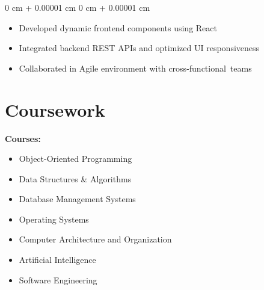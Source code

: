 \documentclass[10pt, letterpaper]{article}
\newenvironment{highlights}{
    \begin{itemize}[
        topsep=0.10 cm,
        parsep=0.10 cm,
        partopsep=0pt,
        itemsep=0pt,
        leftmargin=0 cm + 10pt
    ]
}{
    \end{itemize}
} %
\newenvironment{onecolentry}{
    \begin{adjustwidth}{
        0 cm + 0.00001 cm
    }{
        0 cm + 0.00001 cm
    }
}{
    \end{adjustwidth}
} %
\begin{document}
        \vspace{0.10 cm}
        \begin{onecolentry}
            \begin{highlights}
                \item Developed dynamic frontend components using React


                \item Integrated backend REST APIs and optimized UI responsiveness

                 \item Collaborated in Agile environment with cross-functional teams
               
               
            \end{highlights}
        \end{onecolentry}
        \vspace{0.1 cm}
    

    
    

\vspace{0.1 cm}
\section*{Coursework}
\vspace{0.1 cm}

\textbf{Courses:}
\begin{itemize}[leftmargin=*]
    \item Object-Oriented Programming
    \item Data Structures \& Algorithms
    \item Database Management Systems
    \item Operating Systems
    \item Computer Architecture and Organization
    \item Artificial Intelligence
    \item Software Engineering
\end{itemize}
\end{document}
